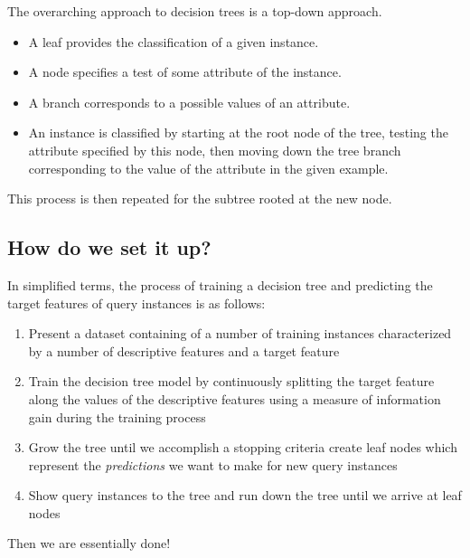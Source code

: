 \documentclass[%
oneside,                 %
final,                   %
10pt]{article}
\begin{document}
The overarching approach to decision trees is a top-down approach.

\begin{itemize}
\item A leaf provides the classification of a given instance.

\item A node specifies a test of some attribute of the instance.

\item A branch corresponds to a possible values of an attribute.

\item An instance is classified by starting at the root node of the tree, testing the attribute specified by this node, then moving down the tree branch corresponding to the value of the attribute in the given example.
\end{itemize}

\noindent
This process is then repeated for the subtree rooted at the new
node.


\subsection{How do we set it up?}


In simplified terms, the process of training a decision tree and
predicting the target features of query instances is as follows:

\begin{enumerate}
\item Present a dataset containing of a number of training instances characterized by a number of descriptive features and a target feature

\item Train the decision tree model by continuously splitting the target feature along the values of the descriptive features using a measure of information gain during the training process

\item Grow the tree until we accomplish a stopping criteria create leaf nodes which represent the \emph{predictions} we want to make for new query instances

\item Show query instances to the tree and run down the tree until we arrive at leaf nodes
\end{enumerate}

\noindent
Then we are essentially done!
\end{document}
